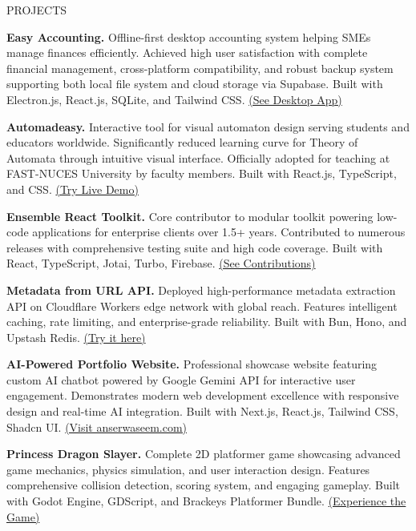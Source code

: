 \documentclass{resume} %
\begin{document}
\begin{rSection}{PROJECTS}
\vspace{-1.25em}
\item \textbf{Easy Accounting.} {Offline-first desktop accounting system helping SMEs manage finances efficiently. Achieved high user satisfaction with complete financial management, cross-platform compatibility, and robust backup system supporting both local file system and cloud storage via Supabase. Built with Electron.js, React.js, SQLite, and Tailwind CSS.
\href{https://github.com/anserwaseem/easy-accounting/releases}{(See Desktop App)}}
\item \textbf{Automadeasy.} {Interactive tool for visual automaton design serving students and educators worldwide. Significantly reduced learning curve for Theory of Automata through intuitive visual interface. Officially adopted for teaching at FAST-NUCES University by faculty members. Built with React.js, TypeScript, and CSS. \href{https://www.automadeasy.com/}{(Try Live Demo)}}
\item \textbf{Ensemble React Toolkit.} {Core contributor to modular toolkit powering low-code applications for enterprise clients over 1.5+ years. Contributed to numerous releases with comprehensive testing suite and high code coverage. Built with React, TypeScript, Jotai, Turbo, Firebase.
\href{https://github.com/EnsembleUI/ensemble-react}{(See Contributions)}}
\item \textbf{Metadata from URL API.} {Deployed high-performance metadata extraction API on Cloudflare Workers edge network with global reach. Features intelligent caching, rate limiting, and enterprise-grade reliability. Built with Bun, Hono, and Upstash Redis.
\href{https://rapidapi.com/hafizanserwaseem/api/metadata-from-url/}{(Try it here)}}
\item \textbf{AI-Powered Portfolio Website.} {Professional showcase website featuring custom AI chatbot powered by Google Gemini API for interactive user engagement. Demonstrates modern web development excellence with responsive design and real-time AI integration. Built with Next.js, React.js, Tailwind CSS, Shadcn UI. \href{https://anserwaseem.com}{(Visit anserwaseem.com)}}
\item \textbf{Princess Dragon Slayer.} {Complete 2D platformer game showcasing advanced game mechanics, physics simulation, and user interaction design. Features comprehensive collision detection, scoring system, and engaging gameplay. Built with Godot Engine, GDScript, and Brackeys Platformer Bundle. \href{https://github.com/anserwaseem/princess-dragon-slayer}{(Experience the Game)}}
\end{rSection} 
\end{document}
